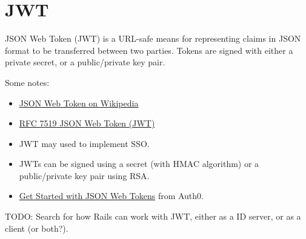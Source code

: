 \section{JWT}

JSON Web Token (JWT) is a URL-safe means for representing
claims in JSON format to be transferred between two parties.
Tokens are signed with either a private secret, or a public/private
key pair.


Some notes:

\begin{itemize}
  \item \href{https://en.wikipedia.org/wiki/JSON_Web_Token}{%
     JSON Web Token on Wikipedia}
  \item \href{https://tools.ietf.org/html/rfc7519}{%
     RFC 7519 JSON Web Token (JWT)}
 \item JWT may used to implement SSO.
 \item JWTs can be signed using a secret (with HMAC algorithm) or a
   public/private key pair using RSA.
 \item \href{https://auth0.com/learn/json-web-tokens/}{%
Get Started with JSON Web Tokens} from Auth0.
\end{itemize}

TODO: Search for how Rails can work with JWT, either as a ID server,
or as a client (or both?).

